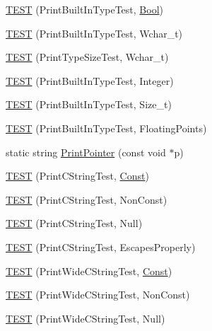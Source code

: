 \begin{DoxyCompactItemize}
\hyperlink{namespacetesting_1_1gtest__printers__test_a6f08c464dc0b8eb822368f552d4467ad}{T\+E\+ST} (Print\+Built\+In\+Type\+Test, \hyperlink{structBool}{Bool})
\item 
\hyperlink{namespacetesting_1_1gtest__printers__test_ab567ebd97eff0a4b9a20a5f5cb77d678}{T\+E\+ST} (Print\+Built\+In\+Type\+Test, Wchar\+\_\+t)
\item 
\hyperlink{namespacetesting_1_1gtest__printers__test_a705ec4c2886606a22194107397fceea6}{T\+E\+ST} (Print\+Type\+Size\+Test, Wchar\+\_\+t)
\item 
\hyperlink{namespacetesting_1_1gtest__printers__test_a278d53e99390c7b31ff531524fe5e86e}{T\+E\+ST} (Print\+Built\+In\+Type\+Test, Integer)
\item 
\hyperlink{namespacetesting_1_1gtest__printers__test_a991dc124d153742c3ca126b2fa9ccab5}{T\+E\+ST} (Print\+Built\+In\+Type\+Test, Size\+\_\+t)
\item 
\hyperlink{namespacetesting_1_1gtest__printers__test_acde0b28d177604ddb5e185d7b107f6f7}{T\+E\+ST} (Print\+Built\+In\+Type\+Test, Floating\+Points)
\item 
static string \hyperlink{namespacetesting_1_1gtest__printers__test_a647fd599f6c81755c3cff8ceeba1740d}{Print\+Pointer} (const void $\ast$p)
\item 
\hyperlink{namespacetesting_1_1gtest__printers__test_a6cd47b21ad8d9ac66ba57b5b6415a924}{T\+E\+ST} (Print\+C\+String\+Test, \hyperlink{namespacetesting_a945ac56c5508a3c9c032bbe8aae8dcfa}{Const})
\item 
\hyperlink{namespacetesting_1_1gtest__printers__test_a89d9905fecee1b976c26d35498734dd4}{T\+E\+ST} (Print\+C\+String\+Test, Non\+Const)
\item 
\hyperlink{namespacetesting_1_1gtest__printers__test_ad29b97d58a4d1e5e8dd4d854f66b9e22}{T\+E\+ST} (Print\+C\+String\+Test, Null)
\item 
\hyperlink{namespacetesting_1_1gtest__printers__test_a140030b990011abab91d4c0b59f21edd}{T\+E\+ST} (Print\+C\+String\+Test, Escapes\+Properly)
\item 
\hyperlink{namespacetesting_1_1gtest__printers__test_a4caa1f81979cdc6f5ada95e01a4fae63}{T\+E\+ST} (Print\+Wide\+C\+String\+Test, \hyperlink{namespacetesting_a945ac56c5508a3c9c032bbe8aae8dcfa}{Const})
\item 
\hyperlink{namespacetesting_1_1gtest__printers__test_a8812b5f088e13083ebb8a7e35fbcdae7}{T\+E\+ST} (Print\+Wide\+C\+String\+Test, Non\+Const)
\item 
\hyperlink{namespacetesting_1_1gtest__printers__test_acd1267d49d61ad53b2b8a88f68fca3a7}{T\+E\+ST} (Print\+Wide\+C\+String\+Test, Null)

\end{DoxyCompactItemize}
